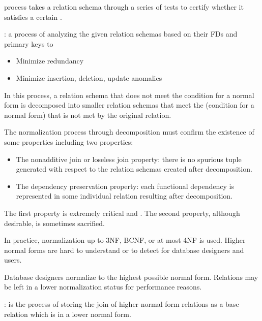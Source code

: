     \par {} process takes a relation schema through a series of tests to certify whether it satisfies a certain .
    \par {}: a process of analyzing the given relation schemas based on their FDs and primary keys to
    \begin{itemize}
      \item Minimize redundancy
      \item Minimize insertion, deletion, update anomalies
    \end{itemize}
    \par In this process, a relation schema that does not meet the condition for a normal form is decomposed into smaller relation schemas that meet the  (condition for a normal form) that is not met by the original relation.
    \par The normalization process through decomposition must confirm the existence of some properties including two properties:
    \begin{itemize}
      \item The nonadditive join or loseless join property: there is no spurious tuple generated with respect to the relation schemas created after decomposition.
      \item The dependency preservation property: each functional dependency is represented in some individual relation resulting after decomposition.
    \end{itemize}
    \par The first property is extremely critical and . The second property, although desirable, is sometimes sacrified.

    \par In practice, normalization up to 3NF, BCNF, or at most 4NF is used. Higher normal forms are hard to understand or to detect for database designers and users.
    \par Database designers  normalize to the highest possible normal form. Relations may be left in a lower normalization status for performance reasons.
    \par {}:  is the process of storing the join of higher normal form relations as a base relation which is in a lower normal form.

